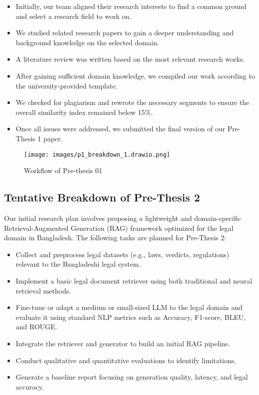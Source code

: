\begin{itemize}
    \item Initially, our team aligned their research interests to find a common ground and select a research field to work on.
    \item We studied related research papers to gain a deeper understanding and background knowledge on the selected domain.
    \item A literature review was written based on the most relevant research works.
    \item After gaining sufficient domain knowledge, we compiled our work according to the university-provided template.
    \item We checked for plagiarism and rewrote the necessary segments to ensure the overall similarity index remained below 15\%.
    \item Once all issues were addressed, we submitted the final version of our Pre-Thesis 1 paper.
\end{itemize}

\begin{figure}
    \centering
    \texttt{[image: images/p1\_breakdown\_1.drawio.png]}
    \caption{Workflow of Pre-thesis 01}
    \label{fig:Workflow of Pre-thesis 01}
\end{figure}



\subsection{Tentative Breakdown of Pre-Thesis 2}

Our initial research plan involves proposing a lightweight and domain-specific Retrieval-Augmented Generation (RAG) framework optimized for the legal domain in Bangladesh. The following tasks are planned for Pre-Thesis 2:

\begin{itemize}
    \item Collect and preprocess legal datasets (e.g., laws, verdicts, regulations) relevant to the Bangladeshi legal system.
    \item Implement a basic legal document retriever using both traditional and neural retrieval methods.
    \item Fine-tune or adapt a medium or small-sized LLM to the legal domain and evaluate it using standard NLP metrics such as Accuracy, F1-score, BLEU, and ROUGE.
    \item Integrate the retriever and generator to build an initial RAG pipeline.
    \item Conduct qualitative and quantitative evaluations to identify limitations.
    \item Generate a baseline report focusing on generation quality, latency, and legal accuracy.
\end{itemize}


